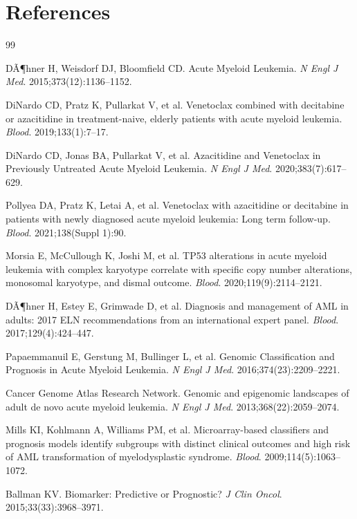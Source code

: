 \documentclass[11pt,a4paper]{article}
\begin{document}
\section*{References}
\begin{thebibliography}{99}

DÃ¶hner H, Weisdorf DJ, Bloomfield CD.
Acute Myeloid Leukemia.
\textit{N Engl J Med}. 2015;373(12):1136--1152.

DiNardo CD, Pratz K, Pullarkat V, et al.
Venetoclax combined with decitabine or azacitidine in treatment-naive, elderly patients with acute myeloid leukemia.
\textit{Blood}. 2019;133(1):7--17.

DiNardo CD, Jonas BA, Pullarkat V, et al.
Azacitidine and Venetoclax in Previously Untreated Acute Myeloid Leukemia.
\textit{N Engl J Med}. 2020;383(7):617--629.

Pollyea DA, Pratz K, Letai A, et al.
Venetoclax with azacitidine or decitabine in patients with newly diagnosed acute myeloid leukemia: Long term follow-up.
\textit{Blood}. 2021;138(Suppl 1):90.

Morsia E, McCullough K, Joshi M, et al.
TP53 alterations in acute myeloid leukemia with complex karyotype correlate with specific copy number alterations, monosomal karyotype, and dismal outcome.
\textit{Blood}. 2020;119(9):2114--2121.

DÃ¶hner H, Estey E, Grimwade D, et al.
Diagnosis and management of AML in adults: 2017 ELN recommendations from an international expert panel.
\textit{Blood}. 2017;129(4):424--447.

Papaemmanuil E, Gerstung M, Bullinger L, et al.
Genomic Classification and Prognosis in Acute Myeloid Leukemia.
\textit{N Engl J Med}. 2016;374(23):2209--2221.

Cancer Genome Atlas Research Network.
Genomic and epigenomic landscapes of adult de novo acute myeloid leukemia.
\textit{N Engl J Med}. 2013;368(22):2059--2074.

Mills KI, Kohlmann A, Williams PM, et al.
Microarray-based classifiers and prognosis models identify subgroups with distinct clinical outcomes and high risk of AML transformation of myelodysplastic syndrome.
\textit{Blood}. 2009;114(5):1063--1072.

Ballman KV.
Biomarker: Predictive or Prognostic?
\textit{J Clin Oncol}. 2015;33(33):3968--3971.


\end{thebibliography}
\end{document}
